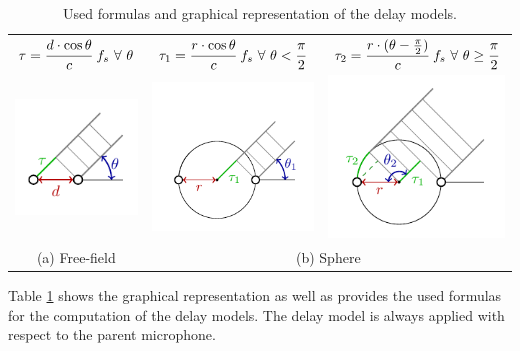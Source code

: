 \begin{table} [H]
\begin{center}
\begin{tabular}{c c c}
$\tau = \cfrac{d\cdot \cos\theta}{c}~f_s~\forall~\theta$ &
$\tau_1 = \cfrac{r\cdot \cos\theta}{c}~f_s~\forall~\theta<\cfrac{\pi}{2}$ &
$\tau_2 = \cfrac{r\cdot(\theta-\frac{\pi}{2})}{c}~f_s~\forall~\theta\geq\cfrac{\pi}{2}$\\ 
\includegraphics[width=.3\textwidth]{micarray_free_field.pdf} &
\includegraphics[width=.3\textwidth]{micarray_sphere1.pdf} &
\includegraphics[width=.3\textwidth]{micarray_sphere2.pdf}\\
(a) Free-field & \multicolumn{2}{c}{(b) Sphere}
\end{tabular}
\caption{Used formulas and graphical representation of the delay models.}
\end{center}
\label{Tab_delaymodels}
\end{table}

Table \ref{Tab_delaymodels} shows the graphical representation as well as provides the used
formulas for the computation of the delay models. The delay model is always applied with
respect to the parent microphone.








